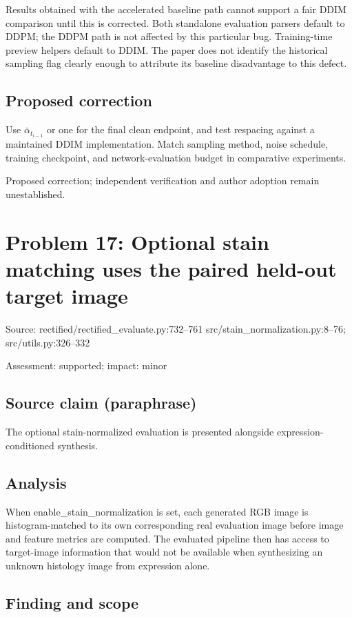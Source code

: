 \documentclass[11pt]{article}
\begin{document}
Results obtained with the accelerated baseline path cannot support a fair DDIM comparison until this is corrected. Both standalone evaluation parsers default to DDPM; the DDPM path is not affected by this particular bug. Training-time preview helpers default to DDIM. The paper does not identify the historical sampling flag clearly enough to attribute its baseline disadvantage to this defect.

\subsection*{Proposed correction}

Use \(\bar\alpha_{t_{i-1}}\) or one for the final clean endpoint, and test respacing against a maintained DDIM implementation. Match sampling method, noise schedule, training checkpoint, and network-evaluation budget in comparative experiments.

Proposed correction; independent verification and author adoption remain unestablished.

\section*{Problem 17: Optional stain matching uses the paired held-out target image}

Source: rectified/rectified\_evaluate.py:732–761 src/stain\_normalization.py:8–76; src/utils.py:326–332

Assessment: supported; impact: minor

\subsection*{Source claim (paraphrase)}

The optional stain-normalized evaluation is presented alongside expression-conditioned synthesis.

\subsection*{Analysis}

When enable\_stain\_normalization is set, each generated RGB image is histogram-matched to its own corresponding real evaluation image before image and feature metrics are computed. The evaluated pipeline then has access to target-image information that would not be available when synthesizing an unknown histology image from expression alone.

\subsection*{Finding and scope}
\end{document}
